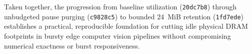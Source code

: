 \documentclass[sigconf,screen,nonacm]{acmart}
\begin{document}
Taken together, the progression from baseline utilization (\texttt{20dc7b8}) through unbudgeted pause purging (\texttt{c9828c5}) to bounded 24~MiB retention (\texttt{1fd7ede}) establishes a practical, reproducible foundation for cutting idle physical DRAM footprints in bursty edge computer vision pipelines without compromising numerical exactness or burst responsiveness.



\end{document}
